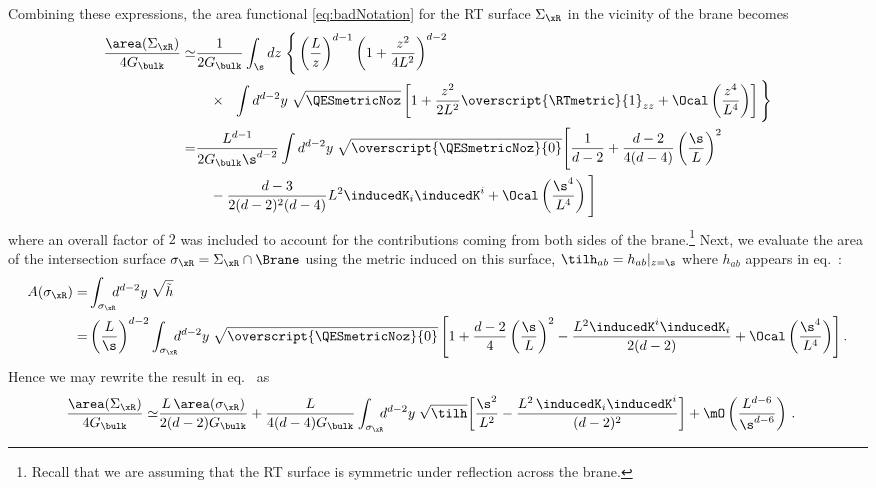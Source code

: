 Combining these expressions, the area functional \eqref{eq:badNotation} for the RT surface $\Sigma_\xR$ in the vicinity of the brane becomes
\begin{align}\label{ramble2}
  \begin{split}
  \frac{\area(\Sigma_\xR)}{4 G_\bulk}
  \simeq& \frac{1}{2 G_\bulk} \int_{\s} dz\;\Bigg\{
  \left(\frac{L}{z}\right)^{d-1}
  \left(1+\frac{z^2}{4L^2}\right)^{d-2} \\
  &\quad\times\ \ \int d^{d-2}y\; \sqrt{\QESmetricNoz}
  \left[
  1 + \frac{z^2}{2L^2} \overscript{\RTmetric}{1}_{zz}
  + \Ocal\left(\frac{z^4}{L^4}\right)
  \right]   \Bigg\} \\
	=& \frac{L^{d-1}}{2 G_\bulk \s^{d-2}}
	\int d^{d-2}y\; \sqrt{\overscript{\QESmetricNoz}{0}}
	\Bigg[
	\frac{1}{d-2}
	+ \frac{d-2}{4(d-4)} \left(\frac{\s}{L}\right)^2
	\\
	&\quad- \frac{d-3}{2(d-2)^2(d-4)} L^2 \inducedK_i \inducedK^i
	+ \Ocal\left(\frac{\s^4}{L^4}\right)
	\Bigg]
\end{split}
\end{align}
where an overall factor of $2$ was included to account for the contributions coming from both sides of the brane.\footnote{Recall that we are assuming that the RT surface is symmetric under  reflection across the brane.}
Next, we evaluate the area of the intersection surface $\sigma_\xR=\Sigma_\xR\cap\Brane$ using the metric induced on this surface, \ie $\tilh_{ab}=h_{ab}|_{z=\s}$ where $h_{ab}$ appears in eq.~:
\begin{align}
  A(\sigma_\xR)
  =& \int_{\sigma_\xR}\!\!\! d^{d-2}y\; \sqrt{\tilde{h}} 	
  \nonumber\\
	=& \left(\frac{L}{\s}\right)^{d-2}
	\int_{\sigma_\xR}\!\!\! d^{d-2}y\; \sqrt{\overscript{\QESmetricNoz}{0}}
	\left[
	1
	+\frac{d-2}{4}\left(\frac{\s}{L}\right)^2
	-\frac{L^2 \inducedK^i \inducedK_i}{2(d-2)}
	+ \Ocal\left(\frac{\s^4}{L^4}\right)
	\right].\label{numnum}
\end{align}
Hence we may rewrite the result in eq.~ as 
\begin{align}
	\begin{split}
  \frac{\area(\Sigma_\xR)}{4 G_\bulk}
  \simeq&
  \frac{L\,\area(\sigma_\xR)}{2(d-2) G_\bulk}+\frac{L}{4(d-4) G_\bulk}\int_{\sigma_\xR}\!\!\! d^{d-2}y\; \sqrt{\tilh}\bigg[ 
    \frac{\s^2}{L^2}
- \frac{L^2\,\inducedK_i \inducedK^i}{(d-2)^2}
	\bigg]
  + \mO\left(\frac{L^{d-6}}{ \s^{d-6}}\right)\,.
	\end{split}
  \label{eq:bazinga}
\end{align}

